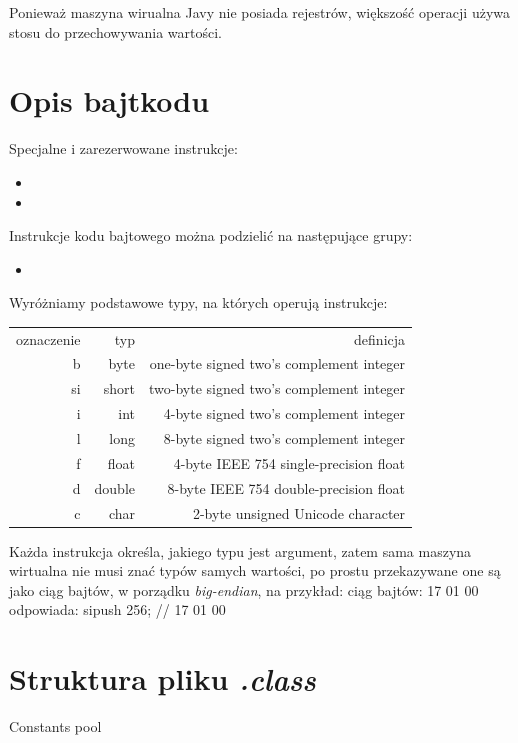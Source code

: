 \documentclass{pracamgr}
\begin{document}
    Ponieważ maszyna wirualna Javy nie posiada rejestrów, większość operacji używa stosu do przechowywania wartości.

    \section{Opis bajtkodu}
    Specjalne i zarezerwowane instrukcje:
    \begin{itemize}
        \item 
        \item
    \end{itemize}
    
    Instrukcje kodu bajtowego można podzielić na następujące grupy:
    \begin{itemize}
        \item
    \end{itemize}
    
    Wyróżniamy podstawowe typy, na których operują instrukcje:
    \begin{center}
        \begin{tabular}{rrr}
            oznaczenie & typ & definicja \\
            b & byte    & one-byte signed two's complement integer \\
            si & short   & two-byte signed two's complement integer \\
            i & int     & 4-byte signed two's complement integer \\
            l & long    & 8-byte signed two's complement integer \\
            f & float   & 4-byte IEEE 754 single-precision float \\
            d & double  & 8-byte IEEE 754 double-precision float \\
            c & char    & 2-byte unsigned Unicode character \\
        \end{tabular}
    \end{center}
    
    Każda instrukcja określa, jakiego typu jest argument, zatem sama maszyna wirtualna nie musi znać typów
    samych wartości, po prostu przekazywane one są jako ciąg bajtów, w porządku \textit{big-endian}, na przykład:
    ciąg bajtów: 17 01 00
    odpowiada:   sipush 256;      // 17 01 00
    
    \section{Struktura pliku \textit{.class}}
    Constants pool
    
\end{document}
